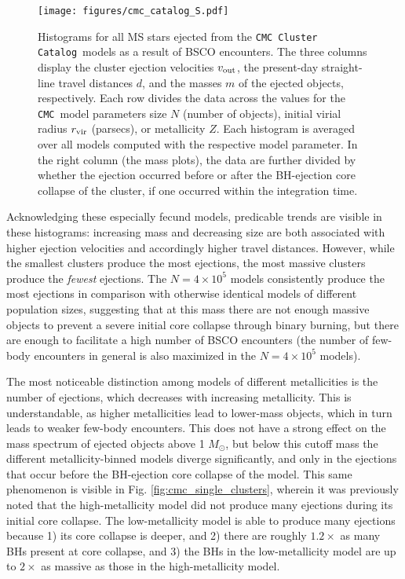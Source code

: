 \documentclass[twocolumn]{aastex631}
\newcommand{\CMC}{\texttt{CMC}}
\newcommand{\CMCcat}{\texttt{CMC Cluster Catalog}}
\begin{document}

\begin{figure*}
    \centering
    \texttt{[image: figures/cmc\_catalog\_S.pdf]}
    \caption{
        Histograms for all MS stars ejected from the \CMCcat\ models as a result of BSCO encounters.
        The three columns display the cluster ejection velocities $v_{\rm out}$, the present-day straight-line travel distances $d$, and the masses $m$ of the ejected objects, respectively.
        Each row divides the data across the values for the \CMC\ model parameters size $N$ (number of objects), initial virial radius $r_{\rm vir}$ (parsecs), or metallicity $Z$.
        Each histogram is averaged over all models computed with the respective model parameter.
        In the right column (the mass plots), the data are further divided by whether the ejection occurred before or after the BH-ejection core collapse of the cluster, if one occurred within the integration time.
    }
    \label{fig:cmc_catalog}
\end{figure*}

Acknowledging these especially fecund models, predicable trends are visible in these histograms: increasing mass and decreasing size are both associated with higher ejection velocities and accordingly higher travel distances.
However, while the smallest clusters produce the most ejections, the most massive clusters produce the \textit{fewest} ejections.
The $N = 4 \times 10^5$ models consistently produce the most ejections in comparison with otherwise identical models of different population sizes, suggesting that at this mass there are not enough massive objects to prevent a severe initial core collapse through binary burning, but there are enough to facilitate a high number of BSCO encounters (the number of few-body encounters in general is also maximized in the $N = 4 \times 10^5$ models).

The most noticeable distinction among models of different metallicities is the number of ejections, which decreases with increasing metallicity.
This is understandable, as higher metallicities lead to lower-mass objects, which in turn leads to weaker few-body encounters.
This does not have a strong effect on the mass spectrum of ejected objects above 1 $M_\odot$, but below this cutoff mass the different metallicity-binned models diverge significantly, and only in the ejections that occur before the BH-ejection core collapse of the model.
This same phenomenon is visible in Fig. \ref{fig:cmc_single_clusters}, wherein it was previously noted that the high-metallicity model did not produce many ejections during its initial core collapse.
The low-metallicity model is able to produce many ejections because 1) its core collapse is deeper, and 2) there are roughly $1.2 \times$ as many BHs present at core collapse, and 3) the BHs in the low-metallicity model are up to $2 \times$ as massive as those in the high-metallicity model.
\end{document}

